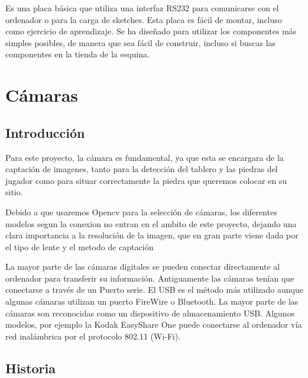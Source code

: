 \documentclass[12pt,a4papert,woside,openright,titlepage,final]{book}
\begin{document}
Es una placa básica que utiliza una interfaz RS232 para comunicarse con el
ordenador o para la carga de sketches. Esta placa es fácil de montar, incluso
como ejercicio de aprendizaje. Se ha diseñado para utilizar los componentes más
simples posibles, de manera que sea fácil de construir, incluso si buscas las
componentes en la tienda de la esquina.







\section{Cámaras}
\subsection{Introducción}

Para este proyecto, la cámara es fundamental, ya que esta se encargara de la
captación de imagenes, tanto para la detección del tablero y las piedras del
jugador como para situar correctamente la piedra que queremos colocar en su
sitio.

Debido a que usaremos Opencv para la selección de cámaras, los diferentes
modelos segun la conexion no entran en el ambito de este proyecto, dejando una
clara importancia a la resolución de la imagen, que en gran parte viene dada por
el tipo de lente y el metodo de captación 

La mayor parte de las cámaras digitales se pueden conectar directamente al
ordenador para transferir su información. Antiguamente las cámaras tenían que
conectarse a través de un Puerto serie. El USB es el método más utilizado aunque
algunas cámaras utilizan un puerto FireWire o Bluetooth. La mayor parte de las
cámaras son reconocidas como un dispositivo de almacenamiento USB. Algunos
modelos, por ejemplo la Kodak EasyShare One puede conectarse al ordenador
vía red inalámbrica por el protocolo 802.11 (Wi-Fi).

\subsection{Historia}
\end{document}
